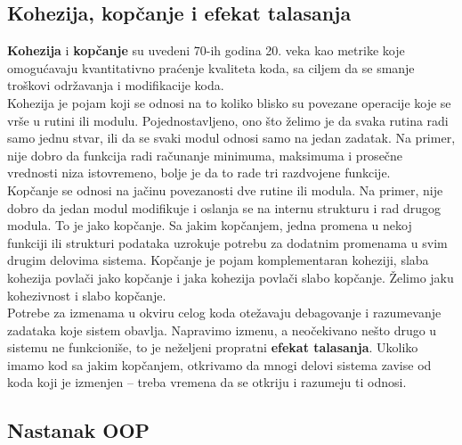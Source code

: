 \documentclass[../main.tex]{subfiles}
\begin{document}
\subsection{Kohezija, kopčanje i efekat talasanja}
{\bf Kohezija} i {\bf kopčanje} su uvedeni 70-ih godina 20. veka kao metrike koje omogućavaju kvantitativno praćenje kvaliteta koda, sa ciljem da se smanje troškovi održavanja i modifikacije koda.
\\
\noindent Kohezija je pojam koji se odnosi na to koliko blisko su povezane operacije koje se vrše u rutini ili modulu. Pojednostavljeno, ono što želimo je da svaka rutina radi samo jednu stvar, ili da se svaki modul odnosi samo na jedan zadatak. Na primer, nije dobro da funkcija radi računanje minimuma, maksimuma i prosečne vrednosti niza istovremeno, bolje je da to rade tri razdvojene funkcije.
\\
\noindent Kopčanje se odnosi na jačinu povezanosti dve rutine ili modula. Na primer, nije dobro da jedan modul modifikuje i oslanja se na internu strukturu i rad drugog modula. To je jako kopčanje. Sa jakim kopčanjem, jedna promena u nekoj funkciji ili strukturi podataka uzrokuje potrebu za dodatnim promenama u svim drugim delovima sistema. Kopčanje je pojam komplementaran koheziji, slaba kohezija povlači jako kopčanje i jaka kohezija povlači slabo kopčanje. Želimo jaku kohezivnost i slabo kopčanje. 
\\
\indent Potrebe za izmenama u okviru celog koda otežavaju debagovanje i razumevanje zadataka koje sistem obavlja. Napravimo izmenu, a neočekivano nešto drugo u sistemu ne funkcioniše, to je neželjeni propratni {\bf efekat talasanja}. Ukoliko imamo kod sa jakim kopčanjem, otkrivamo da mnogi delovi sistema zavise od koda koji je izmenjen -- treba vremena da se otkriju i razumeju ti odnosi.

\subsection{Nastanak OOP}
\end{document}
